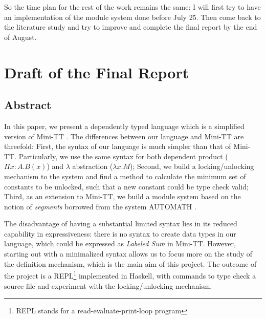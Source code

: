 \documentclass{article}
\theoremstyle{remark}
\begin{document}
So the time plan for the rest of the work remains the same: I will first try to have an implementation of the module system done before July 25. Then come back to the literature study and try to improve and complete the final report by the end of August.

\section{Draft of the Final Report}
\subsection{Abstract}
In this paper, we present a dependently typed language which is a simplified version of Mini-TT \cite{coquand2009simple}. The differences between our language and Mini-TT are threefold: First, the syntax of our language is much simpler than that of Mini-TT. Particularly, we use the same syntax for both dependent product ($\Pi x:A.B(x)$) and $\lambda$ abstraction ($\lambda x . M$); Second, we build a locking/unlocking mechanism to the system and find a method to calculate the minimum set of constants to be unlocked, such that a new constant could be type check valid; Third, as an extension to Mini-TT, we build a module system based on the notion of \emph{segments} borrowed from the system AUTOMATH \cite{de1994survey}.

The disadvantage of having a substantial limited syntax lies in its reduced capability in expressiveness: there is no syntax to create data types in our language, which could be expressed as \emph{Labeled Sum} in Mini-TT. However, starting out with a minimalized syntax allows us to focus more on the study of the definition mechanism, which is the main aim of this project. The outcome of the project is a REPL\footnote{REPL stands for a read-evaluate-print-loop program} implemented in Haskell, with commands to type check a source file and experiment with the locking/unlocking mechanism.
\end{document}
